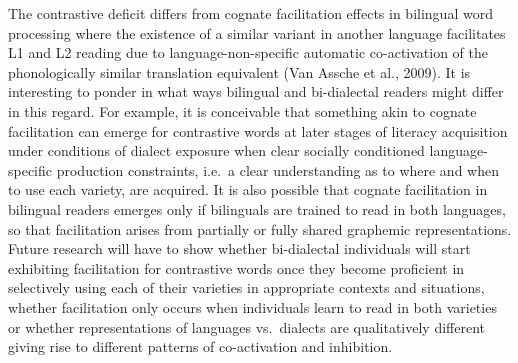 \documentclass[doc,floatsintext]{apa6}
\begin{document}
The contrastive deficit differs from cognate facilitation effects in
bilingual word processing where the existence of a similar variant in
another language facilitates L1 and L2 reading due to
language-non-specific automatic co-activation of the phonologically
similar translation equivalent (Van Assche et al., 2009). It is
interesting to ponder in what ways bilingual and bi-dialectal readers
might differ in this regard. For example, it is conceivable that
something akin to cognate facilitation can emerge for contrastive words
at later stages of literacy acquisition under conditions of dialect
exposure when clear socially conditioned language-specific production
constraints, i.e.~a clear understanding as to where and when to use each
variety, are acquired. It is also possible that cognate facilitation in
bilingual readers emerges only if bilinguals are trained to read in both
languages, so that facilitation arises from partially or fully shared
graphemic representations. Future research will have to show whether
bi-dialectal individuals will start exhibiting facilitation for
contrastive words once they become proficient in selectively using each
of their varieties in appropriate contexts and situations, whether
facilitation only occurs when individuals learn to read in both
varieties or whether representations of languages vs.~dialects are
qualitatively different giving rise to different patterns of
co-activation and inhibition.
\end{document}
